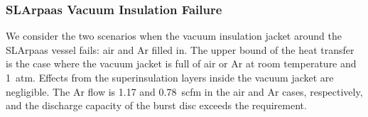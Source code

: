 \subsubsection{SLArpaas Vacuum Insulation Failure}

We consider the two scenarios when the vacuum insulation jacket around the
SLArpaas vessel fails: air and Ar filled in.
The upper bound of the heat transfer is the case where the vacuum jacket
is full of air or Ar at room temperature and 1~atm.
Effects from the superinsulation layers inside the vacuum jacket are negligible.
The Ar flow is 1.17 and 0.78~scfm in the air and Ar cases, respectively,
and the discharge capacity of the burst disc exceeds the requirement.
